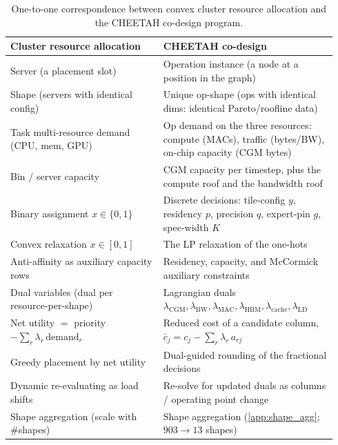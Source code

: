 \begin{table}[h]
\centering
\small
\begin{tabular}{@{}p{0.44\linewidth}p{0.5\linewidth}@{}}
\toprule
Cluster resource allocation \citep{cvxcluster2026} & CHEETAH co-design \\
\midrule
Server (a placement slot) & Operation instance (a node at a position in the graph) \\
Shape (servers with identical config) & Unique op-shape (ops with identical dims: identical Pareto/roofline data) \\
Task multi-resource demand (CPU, mem, GPU) & Op demand on the three resources: compute (MACs), traffic (bytes/BW), on-chip capacity (CGM bytes) \\
Bin / server capacity & CGM capacity per timestep, plus the compute roof and the bandwidth roof \\
Binary assignment $x\in\{0,1\}$ & Discrete decisions: tile-config $y$, residency $p$, precision $q$, expert-pin $g$, spec-width $K$ \\
Convex relaxation $x\in[0,1]$ & The LP relaxation of the one-hots \\
Anti-affinity as auxiliary capacity rows & Residency, capacity, and McCormick auxiliary constraints \\
Dual variables (dual per resource-per-shape) & Lagrangian duals $\lambda_{\mathrm{CGM}},\lambda_{\mathrm{BW}},\lambda_{\mathrm{MAC}},\lambda_{\mathrm{HBM}},\lambda_{\mathrm{cache}},\lambda_{\mathrm{LD}}$ \\
Net utility $=$ priority $-\sum_r \lambda_r\,\mathrm{demand}_r$ & Reduced cost of a candidate column, $\bar c_j = c_j - \sum_r \lambda_r\, a_{rj}$ \\
Greedy placement by net utility & Dual-guided rounding of the fractional decisions \\
Dynamic re-evaluating as load shifts & Re-solve for updated duals as columns / operating point change \\
Shape aggregation (scale with \#shapes) & Shape aggregation (\cref{app:shape_agg}; $903\to13$ shapes) \\
\bottomrule
\end{tabular}
\caption{One-to-one correspondence between convex cluster resource allocation and
the CHEETAH co-design program.}
\label{tab:cvx_mapping}
\end{table}

